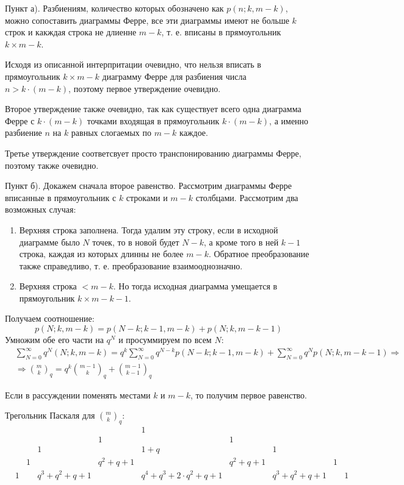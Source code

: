 \documentclass[a4paper,12pt]{article}
\begin{document}
\begin{Solution}
Пункт а). Разбиениям, количество которых обозначено как $p\left(n;k,m-k\right)$, можно сопоставить диаграммы Ферре, все эти диаграммы имеют не больше $k$ строк и какждая строка не длиенне $m-k$, т. е. вписаны в прямоугольник $k \times m-k$.

Исходя из описанной интерпритации очевидно, что нельзя вписать в прямоугольник $k \times m-k$ диаграмму Ферре для разбиения числа $n > k \cdot \left(m-k\right)$, поэтому первое утверждение очевидно.

Второе утверждение также очевидно, так как существует всего одна диаграмма Ферре с $k \cdot \left(m-k\right)$ точками входящая в прямоугольник $k \cdot \left(m-k\right)$, а именно разбиение $n$ на $k$ равных слогаемых по $m-k$ каждое.

Третье утверждение соответсвует просто транспонированию диаграммы Ферре, поэтому также очевидно.

Пункт б). Докажем сначала второе равенство. Рассмотрим диаграммы Ферре вписанные в прямоугольник с $k$ строками и $m-k$ столбцами. Рассмотрим два возможных случая:
\begin{enumerate}
\item Верхняя строка заполнена. Тогда удалим эту строку, если в исходной диаграмме было $N$ точек, то в новой будет $N-k$, а кроме того в ней $k-1$ строка, каждая из которых длинны не более $m-k$. Обратное преобразование также справедливо, т. е. преобразование взаимооднозначно.

\item Верхняя строка $<m-k$. Но тогда исходная диаграмма умещается в прямоугольник $k \times m-k-1$.
\end{enumerate}

Получаем соотношение:
\[
	p\left(N;k,m-k\right) = p\left(N-k;k-1,m-k\right) + p\left(N;k,m-k-1\right)
\]
Умножим обе его части на $q^N$ и просуммируем по всем $N$:
\[
	\begin{split}
		& \sum_{N=0}^{\infty} q^N\left(N;k,m-k\right) = q^k \sum_{N=0}^{\infty} q^{N-k}p\left(N-k;k-1,m-k\right) + \sum_{N=0}^{\infty} q^N p\left(N;k,m-k-1\right) \Rightarrow \\
		& \Rightarrow \binom{m}{k}_q = q^k\binom{m-1}{k}_q + \binom{m-1}{k-1}_q
	\end{split}
\]

Если в рассуждении поменять местами $k$ и $m-k$, то получим первое равенство.

Трегольник Паскаля для $\binom{m}{k}_q$:
\[
	\begin{matrix}
		&&&&& 1\\
		&&&& 1 && 1\\
		&&& 1 && 1+q && 1\\
		&& 1 && q^2+q+1 && q^2+q+1 && 1\\
		& 1 && q^3+q^2+q+1 && q^4+q^3+2\cdot q^2+q+1 && q^3+q^2+q+1 && 1\\
	\end{matrix}
\]


\end{Solution}
\end{document}
